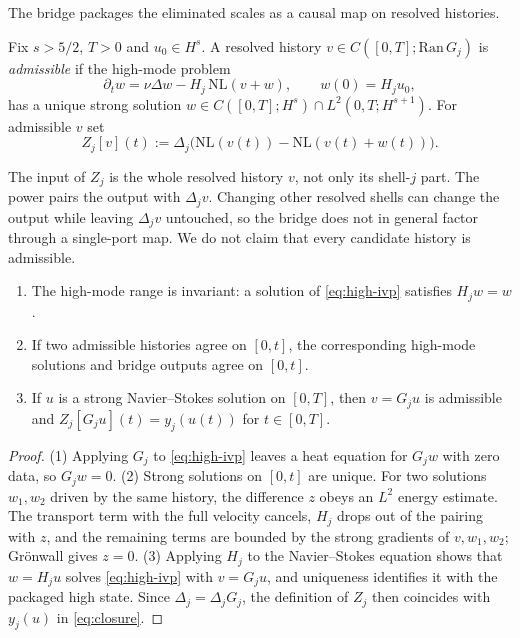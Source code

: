 The bridge packages the eliminated scales as a causal map on resolved histories.

\begin{definition}\label{def:bridge}
Fix $s>5/2$, $T>0$ and $u_0\in H^s$. A resolved history $v\in C([0,T];\mathrm{Ran}\,G_j)$ is
\emph{admissible} if the high-mode problem
\begin{equation}\label{eq:high-ivp}
\partial_t w=\nu\Delta w-H_j\,\mathrm{NL}(v+w),\qquad w(0)=H_ju_0,
\end{equation}
has a unique strong solution $w\in C([0,T];H^s)\cap L^2(0,T;H^{s+1})$. For admissible $v$ set
\[
Z_j[v](t):=\Delta_j\bigl(\mathrm{NL}(v(t))-\mathrm{NL}(v(t)+w(t))\bigr).
\]
\end{definition}

The input of $Z_j$ is the whole resolved history $v$, not only its shell-$j$ part. The power
pairs the output with $\Delta_j v$. Changing other resolved shells can change the output while
leaving $\Delta_j v$ untouched, so the bridge does not in general factor through a single-port map.
We do not claim that every candidate history is admissible.

\begin{proposition}\label{prop:bridge-return}
\leavevmode
\begin{enumerate}
\item The high-mode range is invariant: a solution of \eqref{eq:high-ivp} satisfies $H_jw=w$.
\item If two admissible histories agree on $[0,t]$, the corresponding high-mode solutions and
bridge outputs agree on $[0,t]$.
\item If $u$ is a strong Navier--Stokes solution on $[0,T]$, then $v=G_ju$ is admissible and
$Z_j[G_ju](t)=y_j(u(t))$ for $t\in[0,T]$.
\end{enumerate}
\end{proposition}

\begin{proof}
(1) Applying $G_j$ to \eqref{eq:high-ivp} leaves a heat equation for $G_jw$ with zero data, so
$G_jw=0$. (2) Strong solutions on $[0,t]$ are unique. For two solutions $w_1,w_2$ driven by the
same history, the difference $z$ obeys an $L^2$ energy estimate. The transport term with the full
velocity cancels, $H_j$ drops out of the pairing with $z$, and the remaining terms are bounded by
the strong gradients of $v,w_1,w_2$; Gr\"onwall gives $z=0$. (3) Applying $H_j$ to the
Navier--Stokes equation shows that $w=H_ju$ solves \eqref{eq:high-ivp} with $v=G_ju$, and
uniqueness identifies it with the packaged high state. Since $\Delta_j=\Delta_jG_j$, the definition
of $Z_j$ then coincides with $y_j(u)$ in \eqref{eq:closure}.
\end{proof}

